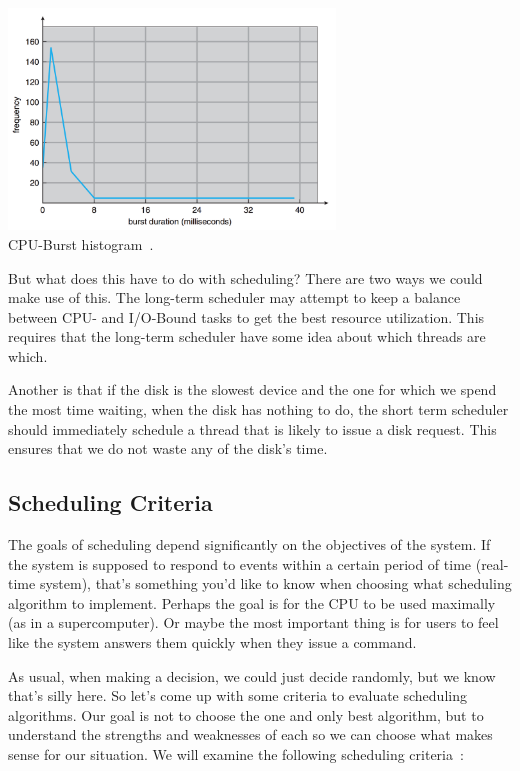 \begin{center}
\includegraphics[width=0.65\textwidth]{images/cpu-burst-histogram.png}\\
CPU-Burst histogram~\cite{osc}.
\end{center}

But what does this have to do with scheduling? There are two ways we could make use of this. The long-term scheduler may attempt to keep a balance between CPU- and I/O-Bound tasks to get the best resource utilization. This requires that the long-term scheduler have some idea about which threads are which.

Another is that if the disk is the slowest device and the one for which we spend the most time waiting, when the disk has nothing to do, the short term scheduler should immediately schedule a thread that is likely to issue a disk request. This ensures that we do not waste any of the disk's time.

\subsection*{Scheduling Criteria}

The goals of scheduling depend significantly on the objectives of the system. If the system is supposed to respond to events within a certain period of time (real-time system), that's something you'd like to know when choosing what scheduling algorithm to implement. Perhaps the goal is for the CPU to be used maximally (as in a supercomputer). Or maybe the most important thing is for users to feel like the system answers them quickly when they issue a command.

As usual, when making a decision, we could just decide randomly, but we know that's silly here. So let's come up with some criteria to evaluate scheduling algorithms. Our goal is not to choose the one and only best algorithm, but to understand the strengths and weaknesses of each so we can choose what makes sense for our situation. We will examine the following scheduling criteria~\cite{osi}:

